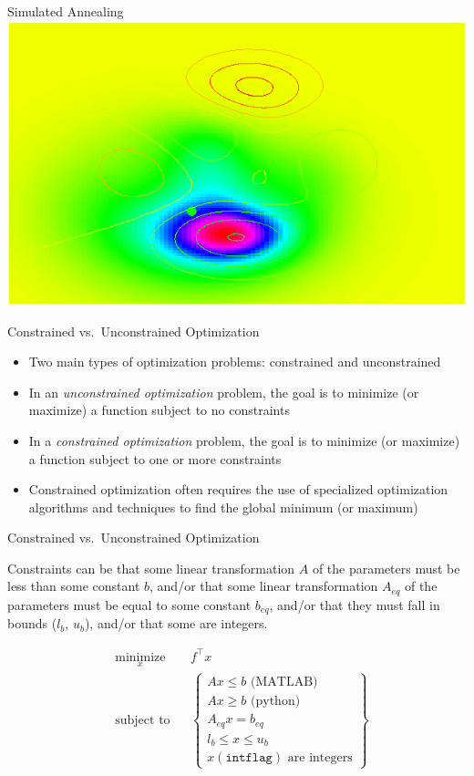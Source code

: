 \documentclass{beamer}
\begin{document}
\begin{frame}[fragile]{Simulated Annealing}
\includegraphics[scale=0.5,bb=10 0 300 190]{anneal2.png}
\end{frame}



\begin{frame}{Constrained vs.\ Unconstrained Optimization}
\begin{itemize}
\item Two main types of optimization problems: constrained and unconstrained
\item In an \emph{unconstrained optimization} problem, the goal is to minimize (or maximize) a function subject to no constraints
\item In a \emph{constrained optimization} problem, the goal is to minimize (or maximize) a function subject to one or more constraints
\item Constrained optimization often requires the use of specialized optimization algorithms and techniques to find the global minimum (or maximum)
\end{itemize}
\end{frame}


\begin{frame}{Constrained vs.\ Unconstrained Optimization}

Constraints can be that some linear transformation $A$ of the parameters must be less than some constant $b$, and/or that some linear transformation $A_{eq}$ of the parameters must be equal to some constant $b_{eq}$, and/or that they must fall in bounds ($l_b$, $u_b$), and/or that some are integers.

\begin{equation*}
\begin{aligned}
& \underset{x}{\text{minimize}}
& & f^\top x \\
& \text{subject to}
& & \begin{Bmatrix}
A x \leq b \text{ (MATLAB) }\\
A x \geq b \text{ (python) }\\
A_{eq} x = b_{eq} \\
l_b \leq x \leq u_b \\
x(\texttt{intflag}) \text{ are integers}
\end{Bmatrix}
\end{aligned}
\end{equation*}

\end{frame}
\end{document}
